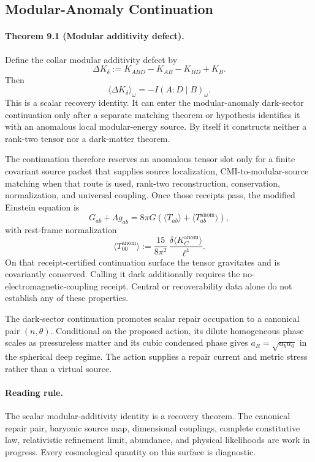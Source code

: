 \subsection{Modular-Anomaly Continuation}

\paragraph{\textbf{Theorem 9.1 (Modular additivity defect).}}
Define the collar modular additivity defect by
\[
\Delta K_\delta:=K_{ABD}-K_{AB}-K_{BD}+K_B.
\]
Then
\[
\langle \Delta K_\delta\rangle_\omega=-I(A:D\mid B)_\omega.
\]
This is a scalar recovery identity. It can enter the modular-anomaly
dark-sector continuation only after a separate matching theorem or hypothesis
identifies it with an anomalous local modular-energy source. By itself it
constructs neither a rank-two tensor nor a dark-matter theorem.

The continuation therefore reserves an anomalous tensor slot only for a finite
covariant source packet that supplies source localization,
CMI-to-modular-source matching when that route is used, rank-two
reconstruction, conservation, normalization, and universal coupling. Once
those receipts pass, the modified Einstein equation is
\[
G_{ab}+\Lambda g_{ab}
=
8\pi G\left(\langle T_{ab}\rangle+\langle T_{ab}^{\mathrm{anom}}\rangle\right),
\]
with rest-frame normalization
\[
\langle T_{00}^{\mathrm{anom}}\rangle
:=
\frac{15}{8\pi^2}\,
\frac{\delta\langle K_C^{\mathrm{anom}}\rangle}{\ell^4}.
\]
On that receipt-certified continuation surface the tensor gravitates and is
covariantly conserved. Calling it dark additionally requires the
no-electromagnetic-coupling receipt. Central or recoverability data alone do
not establish any of these properties.

The dark-sector continuation promotes scalar repair occupation to a canonical
pair \((n,\theta)\). Conditional on the proposed action, its dilute homogeneous
phase scales as pressureless matter and its cubic condensed phase gives
\(a_R=\sqrt{a_ba_0}\) in the spherical deep regime. The action supplies a
repair current and metric stress rather than a virtual source.

\paragraph{\textbf{Reading rule.}}
The scalar modular-additivity identity is a recovery theorem. The canonical
repair pair, baryonic source map, dimensional couplings, complete constitutive
law, relativistic refinement limit, abundance, and physical likelihoods are
work in progress. Every cosmological quantity on this surface is diagnostic.
